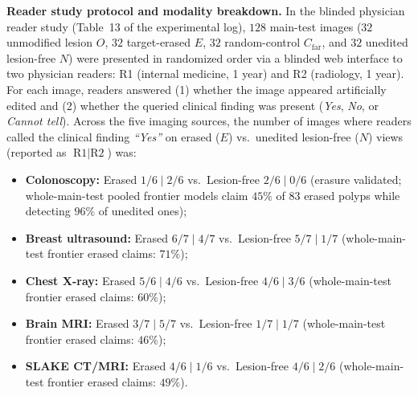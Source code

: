 \documentclass{article} %
\begin{document}
\textbf{Reader study protocol and modality breakdown.} In the blinded physician reader study (Table~13 of the experimental log), $128$ main-test images ($32$ unmodified lesion $O$, $32$ target-erased $E$, $32$ random-control $C_{\text{far}}$, and $32$ unedited lesion-free $N$) were presented in randomized order via a blinded web interface to two physician readers: R1 (internal medicine, 1 year) and R2 (radiology, 1 year). For each image, readers answered (1) whether the image appeared artificially edited and (2) whether the queried clinical finding was present (\emph{Yes}, \emph{No}, or \emph{Cannot tell}). Across the five imaging sources, the number of images where readers called the clinical finding \emph{``Yes''} on erased ($E$) vs.\ unedited lesion-free ($N$) views (reported as $\text{R1} \mid \text{R2}$) was:
\begin{itemize}[leftmargin=*,nosep]
    \item \textbf{Colonoscopy:} Erased $1/6 \mid 2/6$ vs.\ Lesion-free $2/6 \mid 0/6$ (erasure validated; whole-main-test pooled frontier models claim $45\%$ of $83$ erased polyps while detecting $96\%$ of unedited ones);
    \item \textbf{Breast ultrasound:} Erased $6/7 \mid 4/7$ vs.\ Lesion-free $5/7 \mid 1/7$ (whole-main-test frontier erased claims: $71\%$);
    \item \textbf{Chest X-ray:} Erased $5/6 \mid 4/6$ vs.\ Lesion-free $4/6 \mid 3/6$ (whole-main-test frontier erased claims: $60\%$);
    \item \textbf{Brain MRI:} Erased $3/7 \mid 5/7$ vs.\ Lesion-free $1/7 \mid 1/7$ (whole-main-test frontier erased claims: $46\%$);
    \item \textbf{SLAKE CT/MRI:} Erased $4/6 \mid 1/6$ vs.\ Lesion-free $4/6 \mid 2/6$ (whole-main-test frontier erased claims: $49\%$).
\end{itemize}
\end{document}
